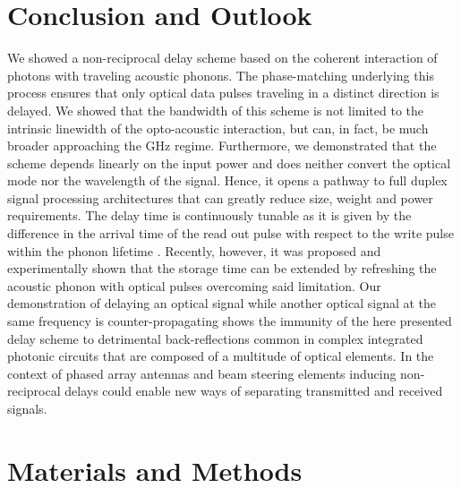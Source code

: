 \documentclass[superscriptaddress, nofootinbib, twocolumn, amsmath,amssymb, aps, pra, notitlepage, longbibliography]{revtex4-1}
\begin{document}
\section{Conclusion and Outlook}
%
We showed a non-reciprocal delay scheme based on the coherent interaction of photons with traveling acoustic phonons. The phase-matching underlying this process ensures that only optical data pulses traveling in a distinct direction is delayed. We showed that the bandwidth of this scheme is not limited to the intrinsic linewidth of the opto-acoustic interaction, but can, in fact, be much broader approaching the GHz regime. Furthermore, we demonstrated that the scheme depends linearly on the input power and does neither convert the optical mode nor the wavelength of the signal. Hence, it opens a pathway to full duplex signal processing architectures that can greatly reduce size, weight and power requirements. The delay time is continuously tunable as it is given by the difference in the arrival time of the read out pulse with respect to the write pulse within the phonon lifetime \cite{Merklein2017}. Recently, however, it was proposed and experimentally shown that the storage time can be extended by refreshing the acoustic phonon with optical pulses \cite{Stiller2019a} overcoming said limitation.  \newline
Our demonstration of delaying an optical signal while another optical signal at the same frequency is counter-propagating shows the immunity of the here presented delay scheme to detrimental back-reflections common in complex integrated photonic circuits that are composed of a multitude of optical elements. In the context of phased array antennas and beam steering elements inducing non-reciprocal delays could enable new ways of separating transmitted and received signals.
%
\section{Materials and Methods}\label{methods}
% 
\end{document}
